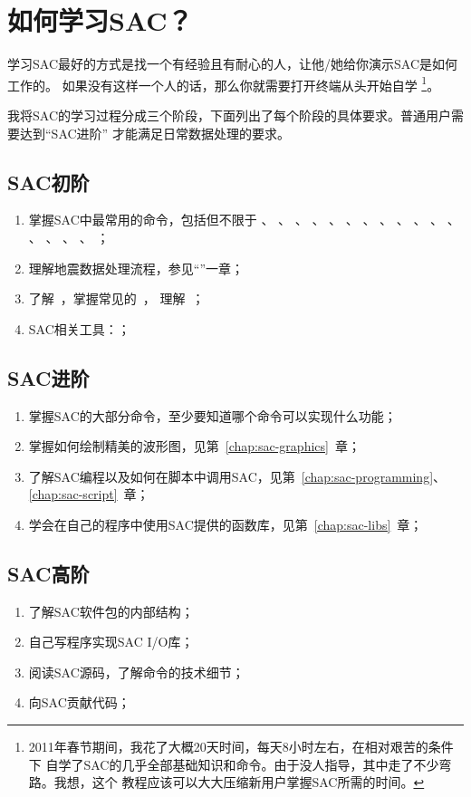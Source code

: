 \section{如何学习SAC？}
学习SAC最好的方式是找一个有经验且有耐心的人，让他/她给你演示SAC是如何工作的。
如果没有这样一个人的话，那么你就需要打开终端从头开始自学
\footnote{2011年春节期间，我花了大概20天时间，每天8小时左右，在相对艰苦的条件下
    自学了SAC的几乎全部基础知识和命令。由于没人指导，其中走了不少弯路。我想，这个
    教程应该可以大大压缩新用户掌握SAC所需的时间。}。

我将SAC的学习过程分成三个阶段，下面列出了每个阶段的具体要求。普通用户需要达到``SAC进阶''
才能满足日常数据处理的要求。

\subsection*{SAC初阶}
\begin{enumerate}
    \item 掌握SAC中最常用的命令，包括但不限于
            、
            、
            、
            、
            、
            、
            、
            、
            、
            、
            、
            、
            、
            、
            、
            、
            ；
        \item 理解地震数据处理流程，参见``''一章；
        \item 了解~，掌握常见的~，
            理解~；
        \item SAC相关工具：；
\end{enumerate}

\subsection*{SAC进阶}
\begin{enumerate}
\item 掌握SAC的大部分命令，至少要知道哪个命令可以实现什么功能；
\item 掌握如何绘制精美的波形图，见第~\ref{chap:sac-graphics}~章；
\item 了解SAC编程以及如何在脚本中调用SAC，见第~\ref{chap:sac-programming}、\ref{chap:sac-script}~章；
\item 学会在自己的程序中使用SAC提供的函数库，见第~\ref{chap:sac-libs}~章；
\end{enumerate}

\subsection*{SAC高阶}
\begin{enumerate}
\item 了解SAC软件包的内部结构；
\item 自己写程序实现SAC I/O库；
\item 阅读SAC源码，了解命令的技术细节；
\item 向SAC贡献代码；
\end{enumerate}
